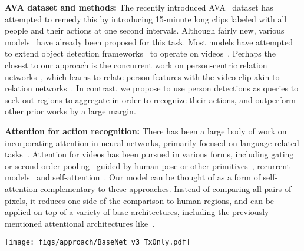 \documentclass[10pt,twocolumn,letterpaper]{article}
\newcommand{\tx}[0]{Action Transformer}
\begin{document}
{\noindent \bf AVA dataset and methods:} The recently introduced AVA~\cite{gu2018ava} dataset has attempted to remedy this by introducing 15-minute long clips labeled with all people and their actions at one second intervals. Although fairly new, various models~\cite{gu2018ava,sun2018arcn,tsinghua_ava,yh_ava_submit} have already been proposed for this task. Most models have attempted to extend object detection frameworks~\cite{he2017mask,ren2015faster,huang2017speed} to operate on videos~\cite{hou2017tube,kalogeiton2017action,girdhar2018detecttrack}. Perhaps the closest to our approach is the concurrent work on person-centric relation networks~\cite{sun2018arcn}, which learns to relate person features with the video clip akin to relation networks~\cite{santoro2017simple}. In contrast, we propose to use person
detections  as queries to seek out regions to aggregate in order to recognize their actions, and outperform~\cite{sun2018arcn} other prior works by a large margin.

{\noindent \bf Attention for action recognition:}
There has been a large body of work on incorporating attention in neural networks, primarily focused on language related tasks~\cite{vaswani2017attention,xu2015show}. Attention for videos has been pursued in various forms, including gating or second order pooling~\cite{xie2017rethinking,Girdhar_17b_AttentionalPoolingAction,long2018attention,miech17loupe} guided by human pose or other primitives~\cite{Baradel_2018_BMVC,Girdhar_17a_ActionVLAD,baradel2017human,Girdhar_17b_AttentionalPoolingAction}, recurrent models~\cite{sharma2015attention} and self-attention~\cite{wang2017non}. Our model can be thought of as a form of self-attention complementary to these approaches.
Instead of comparing all pairs of pixels, it reduces one side of the comparison to human regions, 
and can be applied on top of a variety of base architectures, including the previously mentioned attentional architectures like~\cite{wang2017non}.
 \begin{figure*}[t]
\centering
\texttt{[image: figs/approach/BaseNet\_v3\_TxOnly.pdf]}
\caption{
{\bf Base Network Architecture.}
Our model takes a clip as input and generates a spatio-temporal feature representation using a trunk network, typically the initial layers of I3D. The center frame is passed through an RPN to generate bounding box proposals, and the feature map (padded with location embedding) and each proposal are passed through `head' networks to obtain a feature for the proposal. This feature is then used to regress a tight bounding box and classify into action classes.
The head network consists of a stack of \tx{} (Tx) units, which generates the features to be classified. We also visualize the Tx unit zoomed in, as described in Section~\ref{sec:app:tx_head}.
}\label{fig:base_arch}
\end{figure*}
\end{document}
